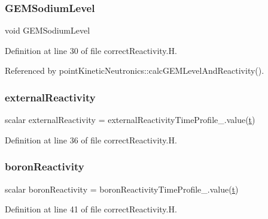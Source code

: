 \subsubsection{\texorpdfstring{G\+E\+M\+Sodium\+Level}{GEMSodiumLevel}}
{\footnotesize\ttfamily void G\+E\+M\+Sodium\+Level}



Definition at line 30 of file correct\+Reactivity.\+H.



Referenced by point\+Kinetic\+Neutronics\+::calc\+G\+E\+M\+Level\+And\+Reactivity().

\mbox{\label{correctReactivity_8H_a49d2206965ac3f071748e09ceea41464}} 
\subsubsection{\texorpdfstring{external\+Reactivity}{externalReactivity}}
{\footnotesize\ttfamily scalar external\+Reactivity = external\+Reactivity\+Time\+Profile\+\_\+.\+value(\hyperlink{correctReactivity_8H_af8e30ff2e3fe21800ba55c8d7534a828}{t})}



Definition at line 36 of file correct\+Reactivity.\+H.

\mbox{\label{correctReactivity_8H_a504c6e003816d4907d35ee2d84317aaa}} 
\subsubsection{\texorpdfstring{boron\+Reactivity}{boronReactivity}}
{\footnotesize\ttfamily scalar boron\+Reactivity = boron\+Reactivity\+Time\+Profile\+\_\+.\+value(\hyperlink{correctReactivity_8H_af8e30ff2e3fe21800ba55c8d7534a828}{t})}



Definition at line 41 of file correct\+Reactivity.\+H.

\mbox{\label{correctReactivity_8H_a7bbab844c16aceff17e70128b5c0e13e}} 
